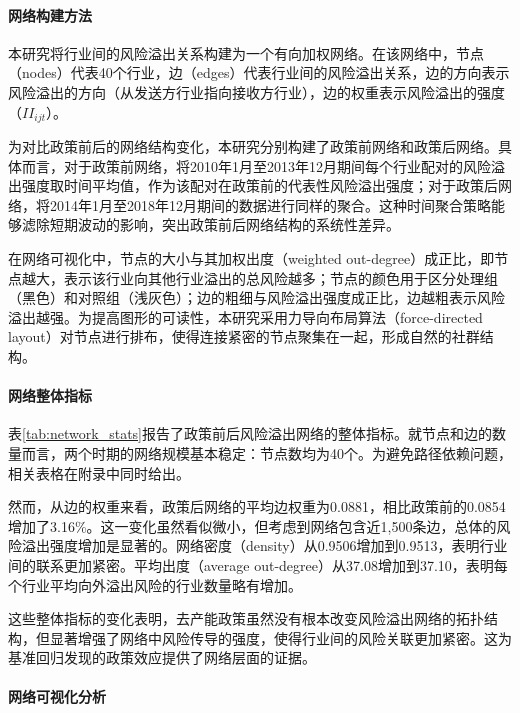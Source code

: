 \paragraph{网络构建方法}

本研究将行业间的风险溢出关系构建为一个有向加权网络。在该网络中，节点（nodes）代表40个行业，边（edges）代表行业间的风险溢出关系，边的方向表示风险溢出的方向（从发送方行业指向接收方行业），边的权重表示风险溢出的强度（$II_{ijt}$）。

为对比政策前后的网络结构变化，本研究分别构建了政策前网络和政策后网络。具体而言，对于政策前网络，将2010年1月至2013年12月期间每个行业配对的风险溢出强度取时间平均值，作为该配对在政策前的代表性风险溢出强度；对于政策后网络，将2014年1月至2018年12月期间的数据进行同样的聚合。这种时间聚合策略能够滤除短期波动的影响，突出政策前后网络结构的系统性差异\citep{acemoglu2012network,Yang2023TailRiskIO}。

在网络可视化中，节点的大小与其加权出度（weighted out-degree）成正比，即节点越大，表示该行业向其他行业溢出的总风险越多；节点的颜色用于区分处理组（黑色）和对照组（浅灰色）；边的粗细与风险溢出强度成正比，边越粗表示风险溢出越强。为提高图形的可读性，本研究采用力导向布局算法（force-directed layout）对节点进行排布，使得连接紧密的节点聚集在一起，形成自然的社群结构。

\paragraph{网络整体指标}

表\ref{tab:network_stats}报告了政策前后风险溢出网络的整体指标。就节点和边的数量而言，两个时期的网络规模基本稳定：节点数均为40个。为避免路径依赖问题，相关表格在附录中同时给出。



然而，从边的权重来看，政策后网络的平均边权重为0.0881，相比政策前的0.0854增加了3.16\%。这一变化虽然看似微小，但考虑到网络包含近1,500条边，总体的风险溢出强度增加是显著的。网络密度（density）从0.9506增加到0.9513，表明行业间的联系更加紧密。平均出度（average out-degree）从37.08增加到37.10，表明每个行业平均向外溢出风险的行业数量略有增加。

这些整体指标的变化表明，去产能政策虽然没有根本改变风险溢出网络的拓扑结构，但显著增强了网络中风险传导的强度，使得行业间的风险关联更加紧密。这为基准回归发现的政策效应提供了网络层面的证据。


\paragraph{网络可视化分析}


